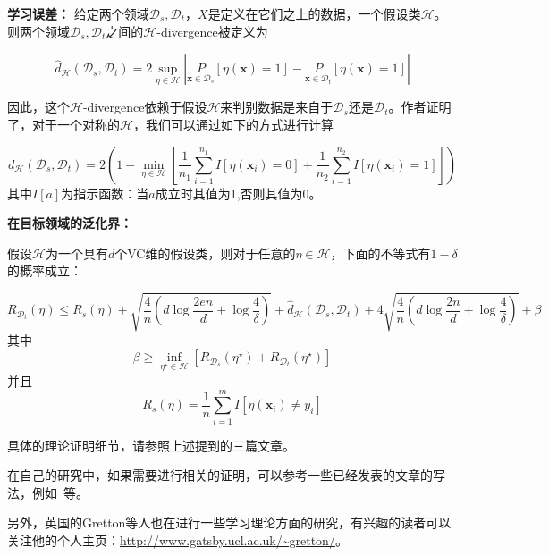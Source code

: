 \textbf{学习误差：} 给定两个领域$\mathcal{D}_s,\mathcal{D}_t$，$X$是定义在它们之上的数据，一个假设类$\mathcal{H}$。则两个领域$\mathcal{D}_s,\mathcal{D}_t$之间的$\mathcal{H}$-divergence被定义为

\begin{equation}
	\hat{d}_{\mathcal{H}}(\mathcal{D}_s,\mathcal{D}_t) = 2 \sup_{\eta \in \mathcal{H}} \left|\underset{\mathbf{x} \in \mathcal{D}_s}{P}[\eta(\mathbf{x}) = 1] - \underset{\mathbf{x} \in \mathcal{D}_t}{P}[\eta(\mathbf{x}) = 1] \right|
\end{equation}

因此，这个$\mathcal{H}$-divergence依赖于假设$\mathcal{H}$来判别数据是来自于$\mathcal{D}_s$还是$\mathcal{D}_t$。作者证明了，对于一个对称的$\mathcal{H}$，我们可以通过如下的方式进行计算

\begin{equation}
	d_\mathcal{H} (\mathcal{D}_s,\mathcal{D}_t) = 2 \left(1 - \min_{\eta \in \mathcal{H}} \left[\frac{1}{n_1} \sum_{i=1}^{n_1} I[\eta(\mathbf{x}_i)=0] + \frac{1}{n_2} \sum_{i=1}^{n_2} I[\eta(\mathbf{x}_i)=1]\right] \right)
\end{equation}
其中$I[a]$为指示函数：当$a$成立时其值为1,否则其值为0。

\textbf{在目标领域的泛化界：}

假设$\mathcal{H}$为一个具有$d$个VC维的假设类，则对于任意的$\eta \in \mathcal{H}$，下面的不等式有$1 - \delta$的概率成立：

\begin{equation}
	R_{\mathcal{D}_t}(\eta) \le R_s(\eta) + \sqrt{\frac{4}{n}(d \log \frac{2en}{d} + \log \frac{4}{\delta})} + \hat{d}_{\mathcal{H}}(\mathcal{D}_s,\mathcal{D}_t) + 4 \sqrt{\frac{4}{n}(d \log \frac{2n}{d} + \log \frac{4}{\delta})} + \beta
\end{equation}
其中
\begin{equation}
	\beta \ge \inf_{\eta^\star \in \mathcal{H}} [R_{\mathcal{D}_s}(\eta^\star) + R_{\mathcal{D}_t}(\eta^\star)]
\end{equation}
并且
\begin{equation}
	R_{s}(\eta) = \frac{1}{n} \sum_{i=1}^{m} I[\eta(\mathbf{x}_i) \ne y_i]
\end{equation}

具体的理论证明细节，请参照上述提到的三篇文章。

在自己的研究中，如果需要进行相关的证明，可以参考一些已经发表的文章的写法，例如~\cite{long2014adaptation}等。

另外，英国的Gretton等人也在进行一些学习理论方面的研究，有兴趣的读者可以关注他的个人主页：\url{http://www.gatsby.ucl.ac.uk/~gretton/}。
